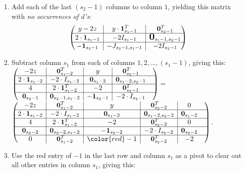 \documentclass[10pt,reqno]{amsart}
\newcommand{\bigzero}{\mbox{\normalfont\Large\bfseries 0}}
\newcommand{\rvline}{\hspace*{-\arraycolsep}\vline\hspace*{-\arraycolsep}}
\def\onesvector{\mathbf{1}}
\def\zerovector{\mathbf{0}}
\begin{document}
\begin{enumerate}
$$\begin{pmatrix}
2\cdot\onesvector_{s_1-1}&\rvline& -2I_{s_1-1} & \rvline & \bigzero_{s_1-1,s_2-1} \\
\hline
(2d-1)\cdot \onesvector_{s_2-1} &\rvline & - J_{s_2-1,s_1-1} & \rvline & -2 I_{s_2-1} 
\end{pmatrix}
$$
\item Add each of the last $(s_2-1)$ columns to column $1$, yielding this matrix with {\it no occurrences of $d$'s}:
$$
\begin{pmatrix}
y-2z&\rvline& y \cdot\onesvector^T_{s_1-1} & \rvline & \zerovector^T_{s_2-1} \\\hline
2\cdot\onesvector_{s_1-1}&\rvline& -2I_{s_1-1} & \rvline & \bigzero_{s_1-1,s_2-1} \\
\hline
-\onesvector_{s_2-1} &\rvline & - J_{s_2-1,s_1-1} & \rvline & -2 I_{s_2-1} 
\end{pmatrix}
$$



\medskip



\item Subtract column $s_1$ from each of columns $1,2,\ldots,(s_1-1)$, giving this:\\
$\begin{pmatrix}
-2z & \rvline & \zerovector^T_{s_1-2} & \rvline &  y &\rvline &\zerovector^T_{s_2-1}  &\\
\hline
2\cdot\onesvector_{s_1-2} & \rvline & -2 \cdot I_{s_1-2} & \rvline & \zerovector_{s_1-2}&\rvline & \zerovector_{s_1-2,s_2-1} &\\
\hline
4  & \rvline & 2 \cdot \onesvector^T_{s_1-2} & \rvline & -2& \rvline & \zerovector^T_{s_2-1}   &\\
\hline
 \zerovector_{s_2-1} & \rvline & \zerovector_{s_2-1,s_1-2}& \rvline &-\onesvector_{s_2-1} &\rvline & -2 \cdot I_{s_2-1}&\\

\end{pmatrix}=$
$\begin{pmatrix}
-2z & \rvline & \zerovector^T_{s_1-2}  & \rvline &  y&\rvline &\zerovector^T_{s_2-2}  &\rvline&0\\
\hline
2\cdot\onesvector_{s_1-2} & \rvline & -2 \cdot I_{s_1-2} & \rvline & \zerovector_{s_1-2}&\rvline & \zerovector_{s_1-2,s_2-2}&\rvline &\zerovector_{s_1-2}\\
\hline
4  & \rvline & 2 \cdot \onesvector^T_{s_1-2} & \rvline & -2& \rvline & \zerovector^T_{s_2-2}   & \rvline &0\\
\hline
 \zerovector_{s_2-2} & \rvline & \zerovector_{s_2-2,s_1-2}& \rvline &-\onesvector_{s_2-2} &\rvline & -2 \cdot I_{s_2-2}& \rvline &\zerovector_{s_2-2}\\
\hline
0 & \rvline & \zerovector^T_{s_1-2}  & \rvline &{\color{red}-1}&\rvline &  \zerovector^T_{s_2-2}&\rvline & -2 &\\
\end{pmatrix}.$
\item Use the red entry of $-1$ in the last row and column $s_1$  as a pivot to clear out all other entries in column $s_1$, giving this:


\end{enumerate}
\end{document}
